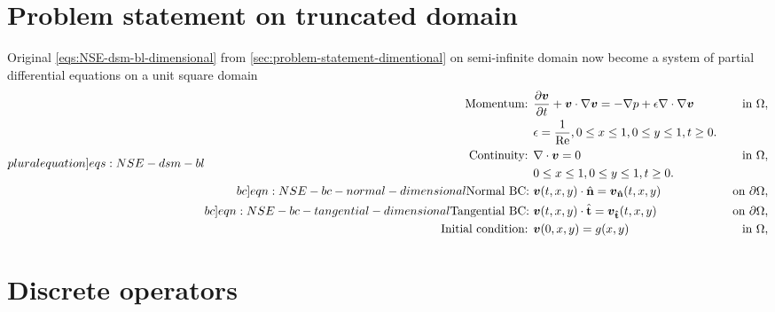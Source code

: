 \documentclass{article}
\numberwithin{equation}{section}
\begin{document}



\section{Problem statement on truncated domain}\label{sec:problem-statement-nondimensional}
Original \cref{eqs:NSE-dsm-bl-dimensional} from \cref{sec:problem-statement-dimentional} on semi-infinite domain now become a system of partial differential equations on a unit square domain 
\begin{subequations}
\label[pluralequation]{eqs:NSE-dsm-bl}
\begin{align}
\label{eqn:momentum}
\text{Momentum: }	&\frac{\partial \boldsymbol{v}}{\partial t} + \boldsymbol{v} \cdot \nabla \boldsymbol{v} = -\nabla p + \epsilon \nabla \cdot \nabla \boldsymbol{v} \quad&\text{ in }\Omega, \\ 
					&\epsilon = \frac{1}{\operatorname{Re}},0\leq x \leq 1, 0\leq y \leq 1, t\geq0.\notag\\
\label{eqn:continuity-dsm-bl}
\text{Continuity: }	& \nabla \cdot \boldsymbol{v} = 0 \quad&\text{ in }\Omega, \\ 
					&0\leq x \leq 1, 0\leq y \leq 1, t\geq0. \notag\\
\label[bc]{eqn:NSE-bc-normal-dimensional}
\text{Normal BC: } & \boldsymbol{v}(t,x,y)\cdot\hat{\mathbf{n}}=\boldsymbol{v}_\mathbf{\hat{n}}(t,x,y) \quad&\text{ on }\partial\Omega, \\
\label[bc]{eqn:NSE-bc-tangential-dimensional}
\text{Tangential BC: } & \boldsymbol{v}(t,x,y)\cdot\hat{\mathbf{t}}=\boldsymbol{v}_\mathbf{\hat{t}}(t,x,y) \quad&\text{ on }\partial\Omega, \\
\label{eqn:NSE-ic-dimensional}
\text{Initial condition: } &\boldsymbol{v}(0,x,y)=g(x,y) \quad&\text{ in }\Omega,
\end{align}
\end{subequations}


	


\pagebreak
\section{Discrete operators}\label{sec:discrete-operators}
\end{document}
